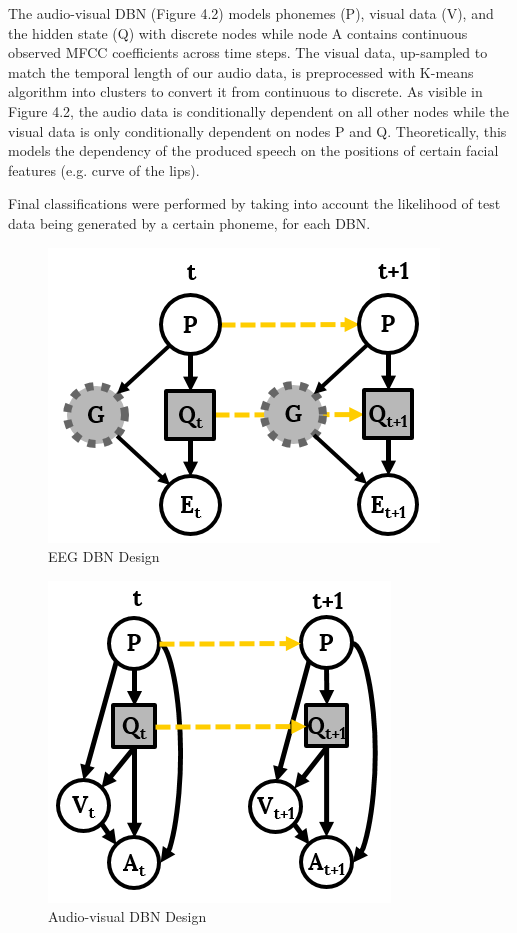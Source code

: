 \documentclass[11pt,letterpaper]{article}
\begin{document}
The audio-visual DBN (Figure 4.2) models phonemes (P), visual data (V), and the hidden state (Q) with discrete nodes while node A contains continuous observed MFCC coefficients across time steps. The visual data, up-sampled to match the temporal length of our audio data, is preprocessed with K-means algorithm into clusters to convert it from continuous to discrete. As visible in Figure 4.2, the audio data is conditionally dependent on all other nodes while the visual data is only conditionally dependent on nodes P and Q. Theoretically, this models the dependency of the produced speech on the positions of certain facial features (e.g. curve of the lips). 

Final classifications were performed by taking into account the likelihood of test data being generated by a certain phoneme, for each DBN. 

\begin{figure}[h]
\centering
\includegraphics[scale=0.5]{dbn_design_eeg}
\caption{EEG DBN Design}
\end{figure}

\begin{figure}[h]
\centering
\includegraphics[scale=0.5]{dbn_design_audio}
\caption{Audio-visual DBN Design}
\end{figure}
\end{document}
